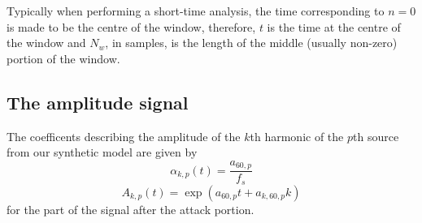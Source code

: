 Typically when performing a short-time analysis,
the time corresponding to $n = 0$ is made to be the centre of the window,
therefore, $t$ is the time at the centre of the window and $N_{w}$, in samples,
is the length of the middle (usually non-zero) portion of the window.

\subsection{The amplitude signal}

The coefficents describing the amplitude of the $k$th harmonic of the $p$th
source from our synthetic model are given by
\begin{equation}
    \alpha_{k,p}(t) = \frac{a_{60,p}}{f_{s}}
\end{equation}
\begin{equation}
    A_{k,p}(t) = \exp(a_{60,p} t + a_{k,60,p} k)
\end{equation}
for the part of the signal after the attack portion.


